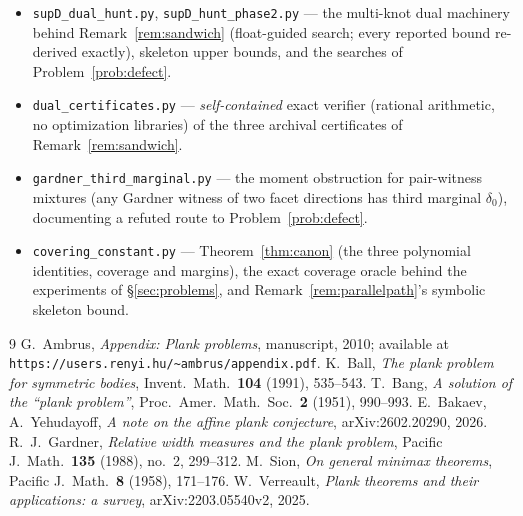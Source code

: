 \documentclass[11pt,reqno]{amsart}
\theoremstyle{plain}
\theoremstyle{definition}
\theoremstyle{remark}
\begin{document}
\begin{itemize}
\item\texttt{supD\_dual\_hunt.py}, \texttt{supD\_hunt\_phase2.py} ---
the multi-knot dual machinery behind Remark~\ref{rem:sandwich}
(float-guided search; every reported bound re-derived exactly), skeleton
upper bounds, and the searches of Problem~\ref{prob:defect}.
\item\texttt{dual\_certificates.py} --- \emph{self-contained} exact
verifier (rational arithmetic, no optimization libraries) of the three
archival certificates of Remark~\ref{rem:sandwich}.
\item\texttt{gardner\_third\_marginal.py} --- the moment obstruction for
pair-witness mixtures (any Gardner witness of two facet directions has
third marginal $\delta_0$), documenting a refuted route to
Problem~\ref{prob:defect}.
\item\texttt{covering\_constant.py} --- Theorem~\ref{thm:canon} (the three
polynomial identities, coverage and margins), the exact coverage oracle
behind the experiments of \S\ref{sec:problems}, and
Remark~\ref{rem:parallelpath}'s symbolic skeleton bound.
\end{itemize}

\begin{thebibliography}{9}
 G.\ Ambrus, \emph{Appendix: Plank problems}, manuscript,
2010; available at \texttt{https://users.renyi.hu/\~{}ambrus/appendix.pdf}.
 K.\ Ball, \emph{The plank problem for symmetric bodies},
Invent.\ Math.\ \textbf{104} (1991), 535--543.
 T.\ Bang, \emph{A solution of the ``plank problem''},
Proc.\ Amer.\ Math.\ Soc.\ \textbf{2} (1951), 990--993.
 E.\ Bakaev, A.\ Yehudayoff, \emph{A note on the affine plank
conjecture}, arXiv:2602.20290, 2026.
 R.\ J.\ Gardner, \emph{Relative width measures and the plank
problem}, Pacific J.\ Math.\ \textbf{135} (1988), no.\ 2, 299--312.
 M.\ Sion, \emph{On general minimax theorems}, Pacific J.\
Math.\ \textbf{8} (1958), 171--176.
 W.\ Verreault, \emph{Plank theorems and their applications: a
survey}, arXiv:2203.05540v2, 2025.
\end{thebibliography}
\end{document}
